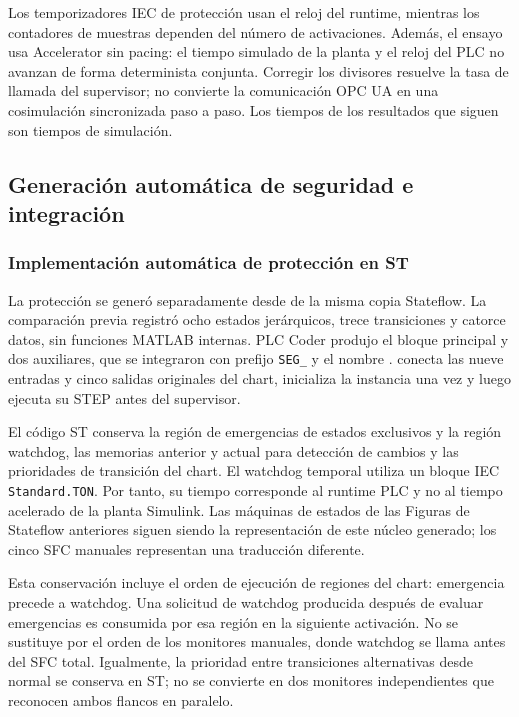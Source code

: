 \documentclass[a4paper,10pt,onecolumn,journal]{ieeeconf}
\numberwithin{equation}{section}
\begin{document}
Los temporizadores IEC de protección usan el reloj del runtime, mientras los contadores de muestras dependen del número de activaciones. Además, el ensayo usa Accelerator sin pacing: el tiempo simulado de la planta y el reloj del PLC no avanzan de forma determinista conjunta. Corregir los divisores resuelve la tasa de llamada del supervisor; no convierte la comunicación OPC UA en una cosimulación sincronizada paso a paso. Los tiempos de los resultados que siguen son tiempos de simulación.


\subsection{Generación automática de seguridad e integración}
\label{subsec:seg_generada_codesys}
\subsubsection{Implementación automática de protección en ST}
La protección se generó separadamente desde  de la misma copia Stateflow. La comparación previa registró ocho estados jerárquicos, trece transiciones y catorce datos, sin funciones MATLAB internas. PLC Coder produjo el bloque principal y dos auxiliares, que se integraron con prefijo \texttt{SEG\_} y el nombre .  conecta las nueve entradas y cinco salidas originales del chart, inicializa la instancia una vez y luego ejecuta su STEP antes del supervisor.

El código ST conserva la región de emergencias de estados exclusivos y la región watchdog, las memorias anterior y actual para detección de cambios y las prioridades de transición del chart. El watchdog temporal utiliza un bloque IEC \texttt{Standard.TON}. Por tanto, su tiempo corresponde al runtime PLC y no al tiempo acelerado de la planta Simulink. Las máquinas de estados de las Figuras de Stateflow anteriores siguen siendo la representación de este núcleo generado; los cinco SFC manuales representan una traducción diferente.

Esta conservación incluye el orden de ejecución de regiones del chart: emergencia precede a watchdog. Una solicitud de watchdog producida después de evaluar emergencias es consumida por esa región en la siguiente activación. No se sustituye por el orden de los monitores manuales, donde watchdog se llama antes del SFC total. Igualmente, la prioridad entre transiciones alternativas desde normal se conserva en ST; no se convierte en dos monitores independientes que reconocen ambos flancos en paralelo.
\end{document}
